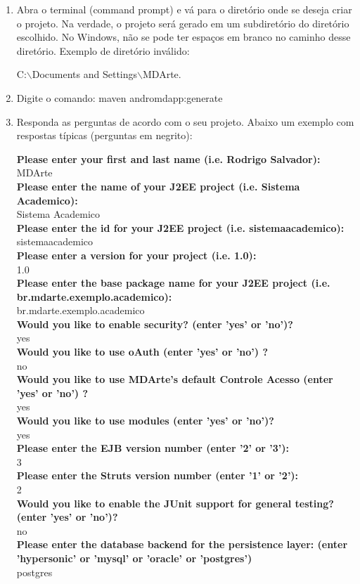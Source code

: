\begin{enumerate}
\item Abra o terminal (command prompt) e vá para o diretório onde se deseja
criar o projeto. Na verdade, o projeto será gerado em um subdiretório do diretório escolhido. No Windows, não se pode ter espaços em branco no caminho desse diretório. Exemplo de diretório inválido:

C:$\backslash$Documents and Settings$\backslash$MDArte.

\item Digite o comando: maven andromdapp:generate

\item Responda as perguntas de acordo com o seu projeto. Abaixo um exemplo com respostas típicas (perguntas em negrito):

\textbf{Please enter your first and last name (i.e. Rodrigo Salvador):} \\
MDArte\\
\textbf{Please enter the name of your J2EE project (i.e. Sistema Academico):}\\
Sistema Academico\\
\textbf{Please enter the id for your J2EE project (i.e. sistemaacademico):}\\
sistemaacademico\\
\textbf{Please enter a version for your project (i.e. 1.0):}\\
1.0\\
\textbf{Please enter the base package name for your J2EE project (i.e.
br.mdarte.exemplo.academico):}\\
br.mdarte.exemplo.academico\\
\textbf{Would you like to enable security? (enter 'yes' or 'no')?}\\
yes\\
\textbf{Would you like to use oAuth (enter 'yes' or 'no') ?}\\
no\\
\textbf{Would you like to use MDArte's default Controle Acesso (enter 'yes' or
'no') ?}\\
yes\\
\textbf{Would you like to use modules (enter 'yes' or 'no')?}\\
yes\\
\textbf{Please enter the EJB version number (enter '2' or '3'):}\\
3\\
\textbf{Please enter the Struts version number (enter '1' or '2'):}\\
2\\
\textbf{Would you like to enable the JUnit support for general testing? (enter
'yes' or 'no')? }\\
 no\\
\textbf{Please enter the database backend for the persistence layer: (enter
'hypersonic' or 'mysql' or 'oracle' or 'postgres')}\\
 postgres\\
 

\end{enumerate}
